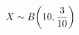 \documentclass[preview]{standalone}
\begin{document}
\begin{align*}
\special{dvisvgm:raw <g id='unique000'>}X\sim B\!\left(10,\dfrac{3}{10}\right)\special{dvisvgm:raw </g>}
\end{align*}
\end{document}
